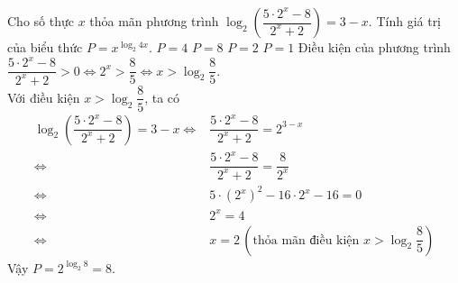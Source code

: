 \begin{ex}%
 Cho số thực $x$ thỏa mãn phương trình $\log_2 \left( \dfrac{5 \cdot 2^x - 8}{2^x + 2} \right) = 3 - x$. Tính giá trị của biểu thức $P = x^{\log_2 4x}$.
 \choice
  {$P = 4$}
  {\True $P = 8$}
  {$P = 2$}
  {$P = 1$}
 \loigiai
  {
  Điều kiện của phương trình $\dfrac{5 \cdot 2^x - 8}{2^x + 2} > 0 \Leftrightarrow 2^x > \dfrac{8}{5} \Leftrightarrow x > \log_2 \dfrac{8}{5}$.\\
  Với điều kiện $x > \log_2 \dfrac{8}{5}$, ta có
  \begin{align*}
   				  \log_2 \left( \dfrac{5 \cdot 2^x - 8}{2^x + 2} \right) = 3 - x 
   \Leftrightarrow & \dfrac{5 \cdot 2^x - 8}{2^x + 2} = 2^{3-x} \\
   \Leftrightarrow & \dfrac{5 \cdot 2^x - 8}{2^x + 2} = \dfrac{8}{2^x} \\
   \Leftrightarrow & 5 \cdot (2^x)^2 - 16 \cdot 2^x - 16 = 0 \\
   \Leftrightarrow & 2^x = 4 \\
   \Leftrightarrow & x = 2 \, \left( \text{thỏa mãn điều kiện } x > \log_2 \dfrac{8}{5} \right)
  \end{align*}
  Vậy $P = 2^{\log_2 8} = 8$.
  }
\end{ex}


